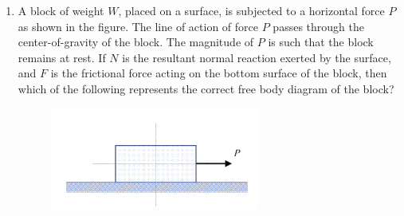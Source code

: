 \documentclass[12pt]{article}
\begin{document}
\begin{enumerate}
\begin{enumerate}
\item $M = P a$
\item $M = P b$
\item $M = P(a+b)$
\item $M = 0$
\end{enumerate}

(GATE XE 2024)

\item A block of weight $W$, placed on a surface, is subjected to a horizontal force $P$ as shown in the figure. The line of action of force $P$ passes through the center-of-gravity of the block. The magnitude of $P$ is such that the block remains at rest. If $N$ is the resultant normal reaction exerted by the surface, and $F$ is the frictional force acting on the bottom surface of the block, then which of the following represents the correct free body diagram of the block?

\begin{figure}[H]
    \centering
    \includegraphics[width=0.5\columnwidth]{figs/ass5_d_q68.png}
    \caption{}
    \label{fig:placeholder}
\end{figure}


\end{enumerate}
\end{document}
